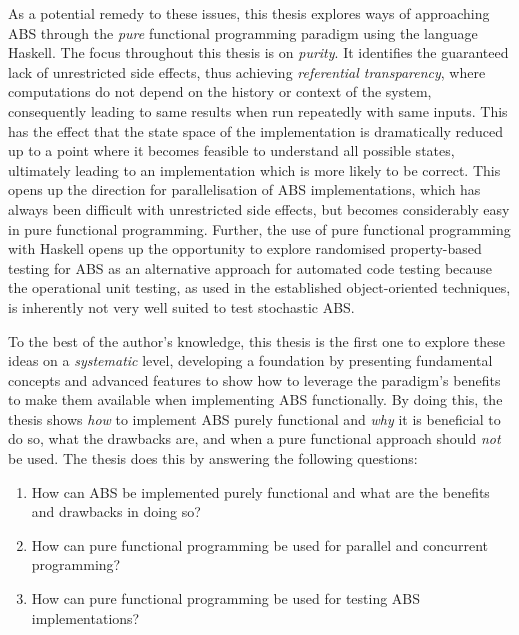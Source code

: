 As a potential remedy to these issues, this thesis explores ways of approaching ABS through the \textit{pure} functional programming paradigm using the language Haskell. The focus throughout this thesis is on \textit{purity}. It identifies the guaranteed lack of unrestricted side effects, thus achieving \textit{referential transparency}, where computations do not depend on the history or context of the system, consequently leading to same results when run repeatedly with same inputs. This has the effect that the state space of the implementation is dramatically reduced up to a point where it becomes feasible to understand all possible states, ultimately leading to an implementation which is more likely to be correct. This opens up the direction for parallelisation of ABS implementations, which has always been difficult with unrestricted side effects, but becomes considerably easy in pure functional programming. Further, the use of pure functional programming with Haskell opens up the opportunity to explore randomised property-based testing for ABS as an alternative approach for automated code testing because the operational unit testing, as used in the established object-oriented techniques, is inherently not very well suited to test stochastic ABS.

To the best of the author's knowledge, this thesis is the first one to explore these ideas on a \textit{systematic} level, developing a foundation by presenting fundamental concepts and advanced features to show how to leverage the paradigm's benefits \cite{hudak_history_2007} to make them available when implementing ABS functionally. By doing this, the thesis shows \textit{how} to implement ABS purely functional and \textit{why} it is beneficial to do so, what the drawbacks are, and when a pure functional approach should \textit{not} be used. The thesis does this by answering the following questions:

\begin{enumerate}
	\item How can ABS be implemented purely functional and what are the benefits and drawbacks in doing so?
	\item How can pure functional programming be used for parallel and concurrent programming? 
	\item How can pure functional programming be used for testing ABS implementations?
\end{enumerate}

\medskip

